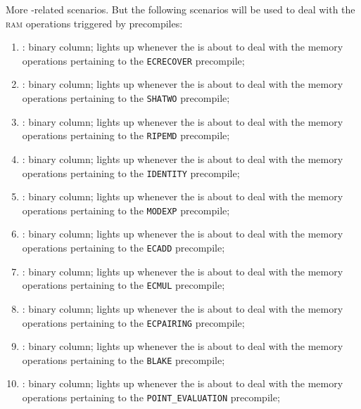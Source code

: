 More -related scenarios. But the following scenarios will be used to deal with the \textsc{ram} operations triggered by precompiles: 
\begin{enumerate}[resume]
	\item \scenEcrecover:       binary column; lights up whenever the \zkEvm{} is about to deal with the memory operations pertaining to the \texttt{ECRECOVER}            precompile;
	\item \scenShaTwo:          binary column; lights up whenever the \zkEvm{} is about to deal with the memory operations pertaining to the \texttt{SHATWO}               precompile;
	\item \scenRipemd:          binary column; lights up whenever the \zkEvm{} is about to deal with the memory operations pertaining to the \texttt{RIPEMD}               precompile;
	\item \scenIdentity:        binary column; lights up whenever the \zkEvm{} is about to deal with the memory operations pertaining to the \texttt{IDENTITY}             precompile;
	\item \scenModexp:          binary column; lights up whenever the \zkEvm{} is about to deal with the memory operations pertaining to the \texttt{MODEXP}               precompile;
	\item \scenEcadd:           binary column; lights up whenever the \zkEvm{} is about to deal with the memory operations pertaining to the \texttt{ECADD}                precompile;
	\item \scenEcmul:           binary column; lights up whenever the \zkEvm{} is about to deal with the memory operations pertaining to the \texttt{ECMUL}                precompile;
	\item \scenEcpairing:       binary column; lights up whenever the \zkEvm{} is about to deal with the memory operations pertaining to the \texttt{ECPAIRING}            precompile;
	\item \scenBlake:           binary column; lights up whenever the \zkEvm{} is about to deal with the memory operations pertaining to the \texttt{BLAKE}                precompile;
	\item \scenPointEvaluation: binary column; lights up whenever the \zkEvm{} is about to deal with the memory operations pertaining to the \texttt{POINT\_EVALUATION}    precompile;

\end{enumerate}
